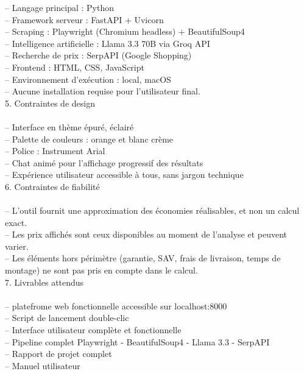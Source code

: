 \documentclass[a4paper, 12pt, twoside]{article}
\begin{document}
– Langage principal : Python\\
– Framework serveur : FastAPI + Uvicorn\\
– Scraping : Playwright (Chromium headless) + BeautifulSoup4\\
– Intelligence artificielle : Llama 3.3 70B via Groq API\\
– Recherche de prix : SerpAPI (Google Shopping)\\
– Frontend : HTML, CSS, JavaScript\\
– Environnement d'exécution : local, macOS\\
– Aucune installation requise pour l'utilisateur final.\\

5. Contraintes de design\\
\\
– Interface en thème épuré, éclairé\\
– Palette de couleurs : orange et blanc crème\\
– Police : Instrument Arial\\
– Chat animé pour l'affichage progressif des résultats\\
– Expérience utilisateur accessible à tous, sans jargon technique\\

6. Contraintes de fiabilité\\
\\
– L'outil fournit une approximation des économies réalisables, et non un calcul exact.\\
– Les prix affichés sont ceux disponibles au moment de l'analyse et peuvent varier.\\
– Les éléments hors périmètre (garantie, SAV, frais de livraison, temps de montage) ne sont pas pris en
compte dans le calcul.\\

7. Livrables attendus\\
\\
– platefrome web fonctionnelle accessible sur localhost:8000\\
– Script de lancement double-clic\\
– Interface utilisateur complète et fonctionnelle\\
– Pipeline complet Playwright - BeautifulSoup4 - Llama 3.3 - SerpAPI\\
– Rapport de projet complet\\
– Manuel utilisateur\\

         \newpage
\end{document}
